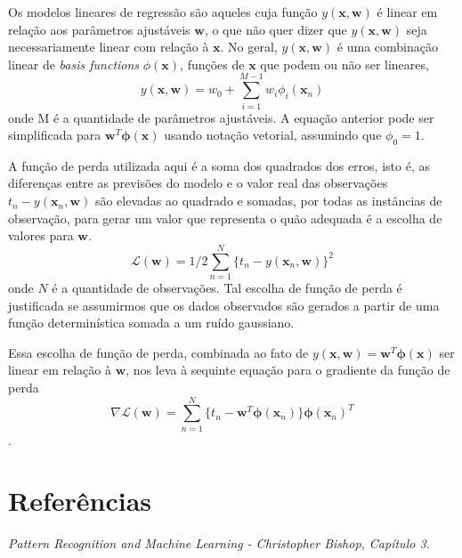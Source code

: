 \documentclass{article}
\begin{document}
Os modelos lineares de regressão são aqueles cuja função \( y(\textbf{x}, \textbf{w}) \) é linear em relação aos parâmetros
ajustáveis \( \textbf{w} \), o que não quer dizer que \( y(\textbf{x}, \textbf{w}) \) seja necessariamente linear com relação
à \( \textbf{x} \). No geral, \( y(\textbf{x}, \textbf{w}) \) é uma combinação linear de \emph{basis functions}
\( \phi(\textbf{x}) \), funções de \( \textbf{x} \) que podem ou não ser lineares,
\[ y(\textbf{x}, \textbf{w}) = w_0 + \sum_{i=1}^{M-1} w_i \phi_i(\textbf{x}_n) \]
onde M é a quantidade de parâmetros ajustáveis. A equação anterior pode ser simplificada para \( \textbf{w}^T \boldsymbol{\phi}(\textbf{x}) \)
usando notação vetorial, assumindo que \( \phi_0 = 1 \).

A função de perda utilizada aqui é a soma dos quadrados dos erros, isto é, as diferenças entre as previsões do modelo e o
valor real das observações \( t_n - y(\textbf{x}_n, \textbf{w}) \) são elevadas ao quadrado e somadas, por todas as instâncias
de observação, para gerar um valor que representa o quão adequada é a escolha de valores para \(\textbf{w}\).
\[ \mathcal{L}(\textbf{w}) = 1/2 \sum_{n=1}^{N} \{ t_n - y(\textbf{x}_n, \textbf{w})\}^2 \]
onde \(N\) é a quantidade de observações. Tal escolha de função de perda é justificada se assumirmos que os dados observados
são gerados a partir de uma função determinística somada a um ruído gaussiano.

Essa escolha de função de perda, combinada ao fato de \( y(\textbf{x}, \textbf{w}) = \textbf{w}^T \boldsymbol{\phi}(\textbf{x}) \) ser linear
em relação à \( \textbf{w} \), nos leva à sequinte equação para o gradiente da função de perda
\[ \nabla \mathcal{L}(\textbf{w}) = \sum_{n=1}^{N} \{ t_n - \textbf{w}^T \boldsymbol{\phi}(\textbf{x}_n) \} \boldsymbol{\phi}(\textbf{x}_n)^T \].

\section{Referências}

\emph{Pattern Recognition and Machine Learning - Christopher Bishop, Capítulo 3.}
\end{document}
